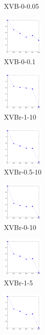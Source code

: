 \documentclass[a4paper,10pt]{article}
\begin{document}
\begin{figure}[ht]
{\begin{subfigure}[b]{2.5cm}
\caption{XVB-0-0.05}
\end{subfigure} 
\begin{subfigure}[b]{2.5cm}
\centering
\includegraphics[height=2cm]{allcat_XVB-0-0_1.pdf}
\caption{XVB-0-0.1}
\end{subfigure} 
\begin{subfigure}[b]{2.5cm}
\centering
\includegraphics[height=2cm]{allcat_XVBr-1-10.pdf}
\caption{XVBr-1-10}
\end{subfigure} 
\begin{subfigure}[b]{2.5cm}
\centering
\includegraphics[height=2cm]{allcat_XVBr-0_5-10.pdf}
\caption{XVBr-0.5-10}
\end{subfigure} 
\begin{subfigure}[b]{2.5cm}
\centering
\includegraphics[height=2cm]{allcat_XVBr-0-10.pdf}
\caption{XVBr-0-10}
\end{subfigure} 
\begin{subfigure}[b]{2.5cm}
\centering
\includegraphics[height=2cm]{allcat_XVBr-1-5.pdf}
\caption{XVBr-1-5}
\end{subfigure} 
\begin{subfigure}[b]{2.5cm}
\centering
\includegraphics[height=2cm]{allcat_XVBr-0_5-5.pdf}

\end{subfigure}}
\end{figure}
\end{document}

